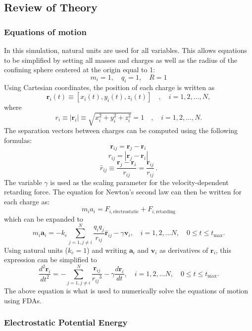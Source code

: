 \documentclass[10pt]{article}
\begin{document}
\pagebreak

\subsection*{Review of Theory}

\subsubsection*{Equations of motion}

In this simulation, natural units are used for all variables. This allows equations to be simplified by
setting all masses and charges as well as the radius of the confining sphere centered at the origin
equal to 1: 
$$m_i = 1, \quad q_i = 1, \quad R = 1$$
Using Cartesian coordinates, the position of each charge is written as 
$$\mathbf{r}_i(t) \equiv [x_i(t), y_i(t), z_i(t)] \quad , \quad i = 1, 2, \dots, N,$$
where
$$r_i \equiv |\mathbf{r}_i| \equiv \sqrt{x_i^2 + y_i^2 + z_i^2} = 1 \quad , \quad i = 1, 2, \dots, N.$$
The separation vectors between charges can be computed using the following formulas:
$$\mathbf{r}_{ij} = \mathbf{r}_j - \mathbf{r}_i \,$$
$$r_{ij} = |\mathbf{r}_j - \mathbf{r}_i| \,$$
$$\hat{r}_{ij} \equiv \frac{\mathbf{r}_j - \mathbf{r}_i}{r_{ij}} = \frac{\mathbf{r}_{ij}}{r_{ij}} \,.$$
The variable $\gamma$ is used as the scaling parameter for the velocity-dependent retarding force. The 
equation for Newton's second law can then be written for each charge as:
$$m_i a_i = F_{i, \textrm{electrostatic}} + F_{i, \textrm{retarding}}$$
which can be expanded to 
$$m_i \mathbf{a}_i=-k_e \sum_{j=1, j \neq i}^N \frac{q_i q_j}{r_{i j}} 
\hat{\mathbf{r}}_{i j}-\gamma \mathbf{v}_i, \quad i=1,2, \ldots N, \quad 0 \leq t \leq t_{\max }.$$
Using natural units ($k_e=1$) and writing $\mathbf{a}_i$ and $\mathbf{v}_i$ as derivatives of 
$\mathbf{r}_i$, this expression can be simplified to 
\begin{equation}\label{EOM}
\frac{d^2 \mathbf{r}_i}{d t^2}=-\sum_{j=1, j \neq i}^N \frac{\mathbf{r}_{i j}}{r_{i j}{ }^3}-\gamma 
\frac{d \mathbf{r}_i}{d t}, \quad i=1,2, \ldots N, \quad 0 \leq t \leq t_{\max }.
\end{equation}
The above equation is what is used to numerically solve the equations of motion using FDAs. 

\subsubsection*{Electrostatic Potential Energy}
\end{document}
